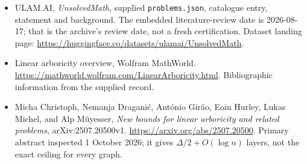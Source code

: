 \documentclass[11pt,a4paper]{article}
\begin{document}
{\small

\begin{itemize}

\item[\hypertarget{source:statement:1}{S1}] ULAM.AI, \emph{UnsolvedMath}, supplied \texttt{problems.json}, catalogue entry, statement and background. The embedded literature-review date is 2026-08-17; that is the archive’s review date, not a fresh certification. Dataset landing page: \url{https://huggingface.co/datasets/ulamai/UnsolvedMath}.

\item[\hypertarget{source:statement:2}{S2}] Linear arboricity overview, Wolfram MathWorld. \url{https://mathworld.wolfram.com/LinearArboricity.html}. Bibliographic information from the supplied record.


\item[E1] Micha Christoph, Nemanja Dragani\'c,
Ant\'onio Gir\~ao, Eoin Hurley, Lukas Michel, and Alp M\"uyesser,
\emph{New bounds for linear arboricity and related problems},
arXiv:2507.20500v1. \url{https://arxiv.org/abs/2507.20500}.
Primary abstract inspected 1 October 2026; it gives
$\Delta/2+O(\log n)$ layers, not the exact ceiling for every graph.

\end{itemize}

}

\label{end:statement}
\end{document}
